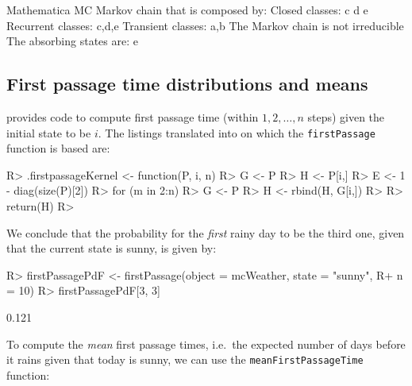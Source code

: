 \documentclass[
  nojss]{jss}
\begin{document}
\begin{CodeChunk}

\begin{CodeOutput}
Mathematica MC  Markov chain that is composed by: 
Closed classes: 
c d 
e 
Recurrent classes: 
{c,d},{e}
Transient classes: 
{a,b}
The Markov chain is not irreducible 
The absorbing states are: e
\end{CodeOutput}
\end{CodeChunk}

\hypertarget{first-passage-time-distributions-and-means}{%
\subsection{First passage time distributions and means}\label{first-passage-time-distributions-and-means}}

\cite{renaldoMatlab} provides code to compute first passage time (within \(1,2,\ldots, n\) steps) given the initial state to be \(i\). The  listings translated into  on which the \texttt{firstPassage} function is based are:

\begin{CodeChunk}

\begin{CodeInput}
R> .firstpassageKernel <- function(P, i, n){
R>   G <- P
R>   H <- P[i,]
R>   E <- 1 - diag(size(P)[2])
R>   for (m in 2:n) {
R>     G <- P %
R>     H <- rbind(H, G[i,])
R>   }
R>   return(H)
R> }
\end{CodeInput}
\end{CodeChunk}

We conclude that the probability for the \emph{first} rainy day to be the third one, given that the current state is sunny, is given by:

\begin{CodeChunk}

\begin{CodeInput}
R> firstPassagePdF <- firstPassage(object = mcWeather, state = "sunny", 
R+                                 n = 10)
R> firstPassagePdF[3, 3]
\end{CodeInput}

\begin{CodeOutput}
[1] 0.121
\end{CodeOutput}
\end{CodeChunk}

To compute the \emph{mean} first passage times, i.e.~the expected number of days before it rains
given that today is sunny, we can use the \texttt{meanFirstPassageTime} function:
\end{document}
